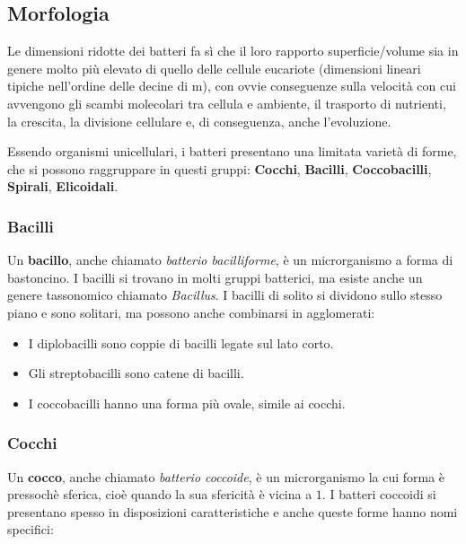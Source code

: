 \documentclass[../main.tex]{subfiles}
\begin{document}
\subsection{Morfologia}

Le dimensioni ridotte dei batteri fa sì che il loro rapporto superficie/volume sia in genere molto più elevato di quello delle cellule eucariote (dimensioni lineari tipiche nell’ordine delle decine di \micro m), con ovvie conseguenze sulla velocità con cui avvengono gli scambi molecolari tra cellula e ambiente, il trasporto di nutrienti, la crescita, la divisione cellulare e, di conseguenza, anche l’evoluzione. \cite{deho_galli_2020}

Essendo organismi unicellulari, i batteri presentano una limitata varietà di forme, che si possono raggruppare in questi gruppi: \textbf{Cocchi}, \textbf{Bacilli}, \textbf{Coccobacilli}, \textbf{Spirali}, \textbf{Elicoidali}.

\subsubsection{Bacilli}

Un \textbf{bacillo}, anche chiamato \textit{batterio bacilliforme}, è un microrganismo a forma di bastoncino. I bacilli si trovano in molti gruppi batterici, ma esiste anche un genere tassonomico chiamato \textit{Bacillus}. I bacilli di solito si dividono sullo stesso piano e sono solitari, ma possono anche combinarsi in agglomerati:

\begin{itemize}
	\itemsep0em 
	\item I diplobacilli sono coppie di bacilli legate sul lato corto.
	\item Gli streptobacilli sono catene di bacilli.
	\item I coccobacilli hanno una forma più ovale, simile ai cocchi.
\end{itemize}

\subsubsection{Cocchi}

Un \textbf{cocco}, anche chiamato \textit{batterio coccoide}, è un microrganismo la cui forma è pressochè sferica, cioè quando la sua sfericità è vicina a $1$. I batteri coccoidi si presentano spesso in disposizioni caratteristiche e anche queste forme hanno nomi specifici: \cite{zapun_2008}
\end{document}
